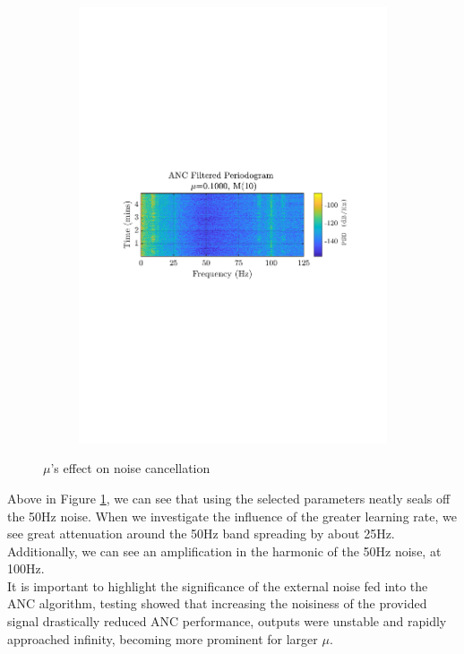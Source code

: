 \documentclass[12pt]{article}
\begin{document}
\begin{figure}[H]
\begin{subfigure}{0.49\textwidth}
					\includegraphics[trim={2.2cm 11.2cm 2.70cm  11.2cm}, clip, width=\textwidth]{../MATLAB/figures/q2_3d_fig05.pdf} 
					\captionsetup{justification=centering}
				\end{subfigure}
				\captionsetup{justification=centering}
				\caption{$\mu$'s effect on noise cancellation}
				\label{fig: 2-3d}
			\end{figure}
		
			Above in Figure \ref{fig: 2-3d}, we can see that using the selected parameters neatly seals off the 50Hz noise. When we investigate the influence of the greater learning rate, we see great attenuation around the 50Hz band spreading by about 25Hz. Additionally, we can see an
			amplification in the harmonic of the 50Hz noise, at 100Hz. \\
			
			It is important to highlight the significance of the external noise fed into the ANC algorithm, testing showed that increasing the noisiness of the provided signal drastically reduced ANC performance, outputs were unstable and rapidly approached infinity, becoming more prominent for larger $\mu$.
	
\end{document}

